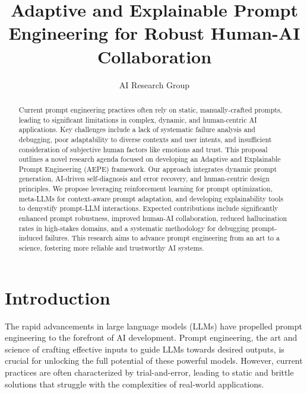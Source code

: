 \documentclass{article}
\title{Adaptive and Explainable Prompt Engineering for Robust Human-AI Collaboration}
\author{AI Research Group}
\date{} %
\begin{document}
\maketitle

\begin{abstract}
Current prompt engineering practices often rely on static, manually-crafted prompts, leading to significant limitations in complex, dynamic, and human-centric AI applications. Key challenges include a lack of systematic failure analysis and debugging, poor adaptability to diverse contexts and user intents, and insufficient consideration of subjective human factors like emotions and trust. This proposal outlines a novel research agenda focused on developing an Adaptive and Explainable Prompt Engineering (AEPE) framework. Our approach integrates dynamic prompt generation, AI-driven self-diagnosis and error recovery, and human-centric design principles. We propose leveraging reinforcement learning for prompt optimization, meta-LLMs for context-aware prompt adaptation, and developing explainability tools to demystify prompt-LLM interactions. Expected contributions include significantly enhanced prompt robustness, improved human-AI collaboration, reduced hallucination rates in high-stakes domains, and a systematic methodology for debugging prompt-induced failures. This research aims to advance prompt engineering from an art to a science, fostering more reliable and trustworthy AI systems.
\end{abstract}

\section{Introduction}
The rapid advancements in large language models (LLMs) have propelled prompt engineering to the forefront of AI development. Prompt engineering, the art and science of crafting effective inputs to guide LLMs towards desired outputs, is crucial for unlocking the full potential of these powerful models. However, current practices are often characterized by trial-and-error, leading to static and brittle solutions that struggle with the complexities of real-world applications.
\end{document}
